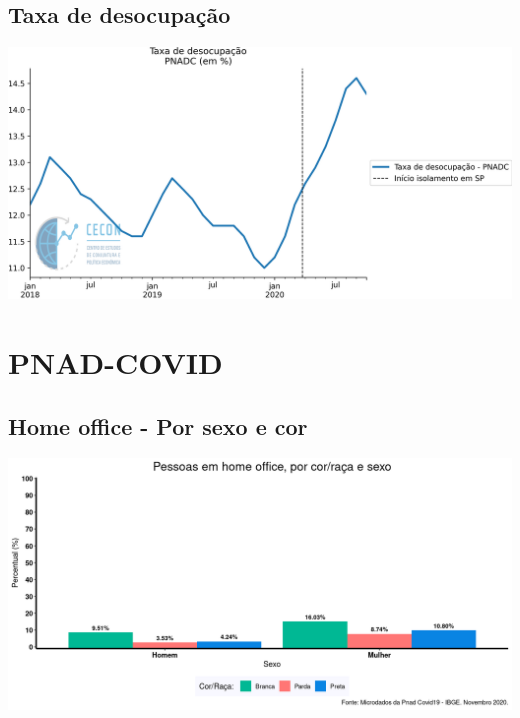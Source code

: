 \documentclass{SelfArx}
\begin{document}
\subsection*{Taxa de desocupação}
\label{sec:org6c15f21}

\begin{center}
\includegraphics[width=.9\linewidth]{./figs/Emprego/TaxaDesocupacao.png}
\end{center}

\section*{PNAD-COVID}
\label{sec:org8dba23b}
\subsection*{Home office - Por sexo e cor}
\label{sec:org9452167}




\begin{center}
\includegraphics[width=.9\linewidth]{./figs/PNAD_COVID/home_sexo_cor.png}
\end{center}
\end{document}
